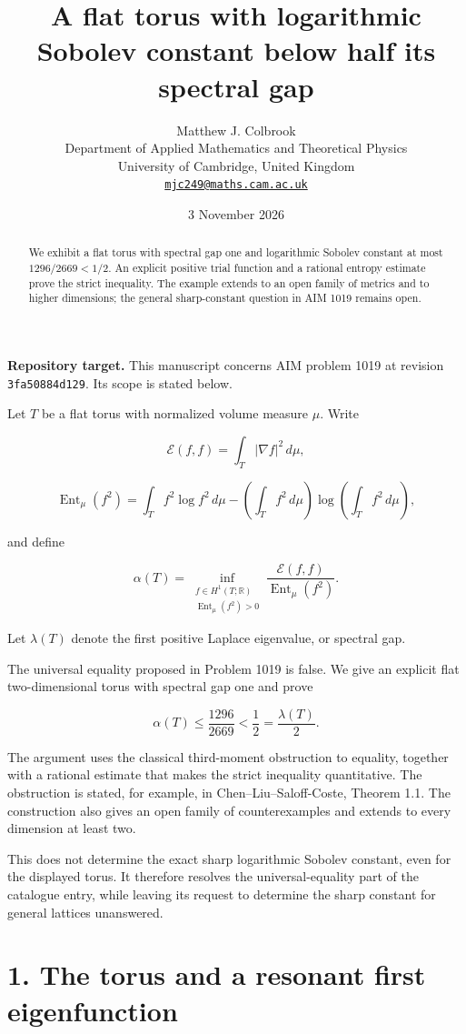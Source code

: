 \documentclass[11pt,a4paper]{article}
\title{\textbf{A flat torus with logarithmic Sobolev constant below half its spectral gap}}
\author{Matthew J. Colbrook\\[3pt]
{\small Department of Applied Mathematics and Theoretical Physics}\\
{\small University of Cambridge, United Kingdom}\\
{\small\href{mailto:mjc249@maths.cam.ac.uk}{\texttt{mjc249@maths.cam.ac.uk}}}}
\date{3 November 2026}
\begin{document}
\maketitle
\begin{abstract}
We exhibit a flat torus with spectral gap one and logarithmic Sobolev constant at most $1296/2669<1/2$. An explicit positive trial function and a rational entropy estimate prove the strict inequality. The example extends to an open family of metrics and to higher dimensions; the general sharp-constant question in AIM 1019 remains open.
\end{abstract}
\noindent\textbf{Repository target.}
This manuscript concerns AIM problem 1019 at revision
\texttt{3fa50884d129}. Its scope is stated below.
\medskip

Let \(T\) be a flat torus with normalized volume measure \(\mu\). Write

\[
\mathcal E(f,f)=\int_T|\nabla f|^2\,d\mu,
\]

\[
\operatorname{Ent}_\mu(f^2)
=\int_T f^2\log f^2\,d\mu
-\left(\int_T f^2\,d\mu\right)
 \log\left(\int_T f^2\,d\mu\right),
\]

and define

\[
\alpha(T)=\inf_{\substack{f\in H^1(T;\mathbb R)\\
\operatorname{Ent}_\mu(f^2)>0}}
\frac{\mathcal E(f,f)}{\operatorname{Ent}_\mu(f^2)}.
\]

Let \(\lambda(T)\) denote the first positive Laplace eigenvalue, or
spectral gap.

The universal equality proposed in Problem 1019 is false. We give an
explicit flat two-dimensional torus with spectral gap one and prove

\[
\boxed{\alpha(T)\leq\frac{1296}{2669}<\frac12=\frac{\lambda(T)}2.}
\]

The argument uses the classical third-moment obstruction to equality,
together with a rational estimate that makes the strict inequality
quantitative. The obstruction is stated, for example, in
Chen--Liu--Saloff-Coste, Theorem 1.1. The construction also gives an
open family of counterexamples and extends to every dimension at least
two.

This does not determine the exact sharp logarithmic Sobolev constant,
even for the displayed torus. It therefore resolves the
universal-equality part of the catalogue entry, while leaving its
request to determine the sharp constant for general lattices unanswered.

\hypertarget{1019-the-torus-and-a-resonant-first-eigenfunction}{%
\section{1. The torus and a resonant first
eigenfunction}\label{1019-the-torus-and-a-resonant-first-eigenfunction}}
\end{document}
